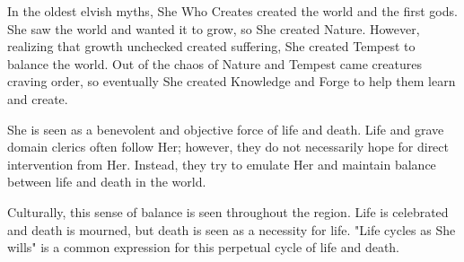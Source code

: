 In the oldest elvish myths, She Who Creates created the world and the first gods.
She saw the world and wanted it to grow, so She created Nature.
However, realizing that growth unchecked created suffering, She created Tempest to balance the world.
Out of the chaos of Nature and Tempest came creatures craving order, so eventually She created Knowledge and Forge to help them learn and create.

She is seen as a benevolent and objective force of life and death.
Life and grave domain clerics often follow Her; however, they do not necessarily hope for direct intervention from Her.
Instead, they try to emulate Her and maintain balance between life and death in the world.

Culturally, this sense of balance is seen throughout the region.
Life is celebrated and death is mourned, but death is seen as a necessity for life.
"Life cycles as She wills" is a common expression for this perpetual cycle of life and death.
